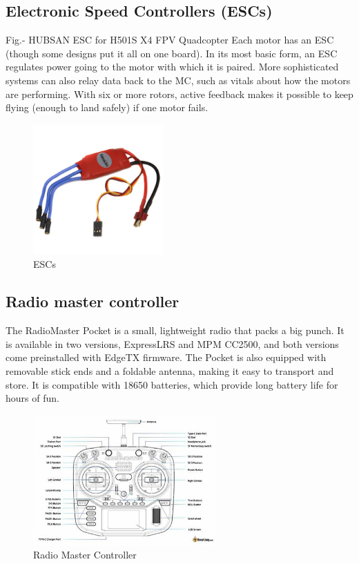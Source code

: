 \documentclass[conference]{IEEEtran}
\begin{document}
\subsection{Electronic Speed Controllers (ESCs)}

 Fig.- HUBSAN ESC for H501S X4 FPV Quadcopter
Each motor has an ESC (though some designs put it all on one board). In its most basic form, an ESC regulates
power going to the motor with which it is paired. More sophisticated systems can also relay data back to
the MC, such as vitals about how the motors are performing. With six or more rotors, active feedback
makes it possible to keep flying (enough to land safely) if one motor fails.
\begin{figure}[th]
    \centering
    \includegraphics[height=5cm,width=\linewidth]{images/simonk 30 a.jpg}
    \caption{ESCs}
    \label{fig:enter-label}
\end{figure}

\subsection{Radio master controller}

The RadioMaster Pocket is a small, lightweight radio that packs a big punch. It is available in two versions, ExpressLRS and MPM CC2500, and both versions come preinstalled with EdgeTX firmware. The Pocket is also equipped with removable stick ends and a foldable antenna, making it easy to transport and store. It is compatible with 18650 batteries, which provide long battery life for hours of fun.
\begin{figure}[th]
    \centering
    \includegraphics[height=5cm,width=\linewidth]{images/Radio master controller.jpg}
    \caption{Radio Master Controller}
    \label{fig:enter-label}
\end{figure}
\end{document}
